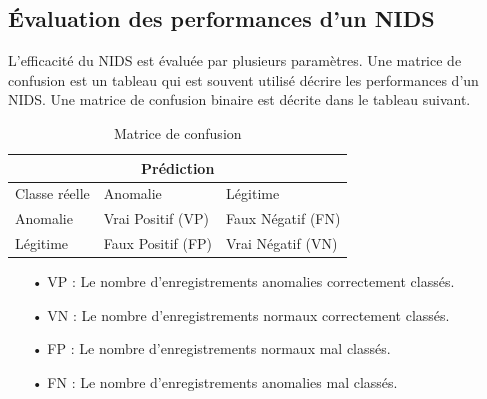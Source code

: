 \subsection{Évaluation des performances d'un NIDS}
\label{evaluation}
L'efficacité du NIDS est évaluée par plusieurs paramètres. Une matrice de confusion est un tableau qui est souvent utilisé décrire les performances d'un NIDS. Une matrice de confusion binaire est décrite dans le tableau suivant.
\begin{table}[h]
	\begin{center}
		\begin{tabular}{  | m{4cm} | m{4cm} | m{4cm} | }
			\multicolumn{3}{c}{Prédiction}\\
			\hline
			Classe réelle  & Anomalie & Légitime\\
			\hline
			Anomalie & Vrai Positif (VP) & Faux Négatif (FN)\\
			\hline
			Légitime & Faux Positif (FP) & Vrai Négatif (VN)\\
			\hline
		\end{tabular}
		\caption{Matrice de confusion}
	\end{center}
	\label{table:NIDS_Evaluation}
\end{table}

\begin{itemize}
	\item[• VP] : Le nombre d’enregistrements anomalies correctement classés.\\
	\item[• VN] : Le nombre d’enregistrements normaux correctement classés.\\
	\item[• FP] : Le nombre d’enregistrements normaux mal classés.\\
	\item[• FN] : Le nombre d’enregistrements anomalies mal classés.\\ 
\end{itemize}

